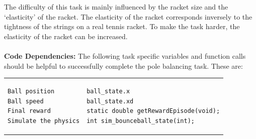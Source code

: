 \documentclass[11pt, article, colorback]{article}
\begin{document}
The difficulty of this task is mainly influenced by the racket size and the `elasticity' of the racket. The elasticity 
of the racket corresponds inversely to the tightness of the strings on a real tennis racket. To make the task harder, the 
elasticity of the racket can be increased. 
		\\  \\
%
\textbf{Code Dependencies:} The following task specific variables and function calls should be helpful to 
successfully complete the pole balancing task. These are: \\
\begin{tabular}{ m{7cm} m{4cm}}
\begin{lstlisting}
Ball position
Ball speed
Final reward
Simulate the physics
\end{lstlisting}
& \begin{lstlisting}
ball_state.x
ball_state.xd
static double getRewardEpisode(void);
int sim_bounceball_state(int);
\end{lstlisting}
\end{tabular} \\
\end{document}
